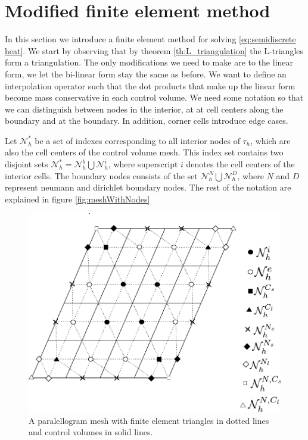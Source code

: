 \documentclass[../Main/main.tex]{subfiles}
\begin{document}
	\section*{Modified finite element method}
	In this section we introduce a finite element method for solving \eqref{eq:semidiscrete heat}. We start by observing that by theorem \ref{th:L_triangulation} the L-triangles form a triangulation. The only modifications we need to make are to the linear form, we let the bi-linear form stay the same as before. We want to define an interpolation operator such that the dot products that make up the linear form become mass conservative in each control volume. We need some notation so that we can distinguish between nodes in the interior, at at cell centers along the boundary and at the boundary. In addition, corner cells introduce edge cases. 
	\par 
	Let $\mathcal{N}_h^*$ be a set of indexes corresponding to all interior nodes of $\tau_h$, which are also the cell centers of the control volume mesh. This index set contains two disjoint sets $\mathcal{N}_h^* = \mathcal{N}_h^b \bigcup \mathcal{N}_h^i$, where superscript $i$ denotes the cell centers of the interior cells. The boundary nodes consists of the set $\mathcal{N}_h^N \bigcup \mathcal{N}_h^D$, where $N$ and $D$ represent neumann and dirichlet boundary nodes. The rest of the notation are explained in figure \ref{fig:meshWithNodes}
	\begin{figure}[H]\label{fig:mesWithNodes}
		\centering
		\includegraphics{meshWithNodes.pdf}
		\caption{A paralellogram mesh with finite element triangles in dotted lines and control volumes in solid lines.}
	\end{figure}
\end{document}
